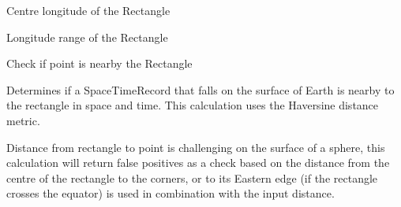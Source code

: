 \documentclass[letterpaper,10pt,english]{sphinxmanual}
\begin{document}
\begin{fulllineitems}

\begin{fulllineitems}
\label{\detokenize{users_guide:GeoSpatialTools.octtree.SpaceTimeRectangle.lon}}
\pysigstartsignatures
{}
\pysigstopsignatures
\sphinxAtStartPar
Centre longitude of the Rectangle

\end{fulllineitems}


\begin{fulllineitems}
\label{\detokenize{users_guide:GeoSpatialTools.octtree.SpaceTimeRectangle.lon_range}}
\pysigstartsignatures
{}
\pysigstopsignatures
\sphinxAtStartPar
Longitude range of the Rectangle

\end{fulllineitems}


\begin{fulllineitems}
\label{\detokenize{users_guide:GeoSpatialTools.octtree.SpaceTimeRectangle.nearby}}
\pysigstartsignatures
{}
\pysigstopsignatures
\sphinxAtStartPar
Check if point is nearby the Rectangle

\sphinxAtStartPar
Determines if a SpaceTimeRecord that falls on the surface of Earth is
nearby to the rectangle in space and time. This calculation uses the
Haversine distance metric.

\sphinxAtStartPar
Distance from rectangle to point is challenging on the surface of a
sphere, this calculation will return false positives as a check based
on the distance from the centre of the rectangle to the corners, or
to its Eastern edge (if the rectangle crosses the equator) is used in
combination with the input distance.


\end{fulllineitems}
\end{fulllineitems}
\end{document}
